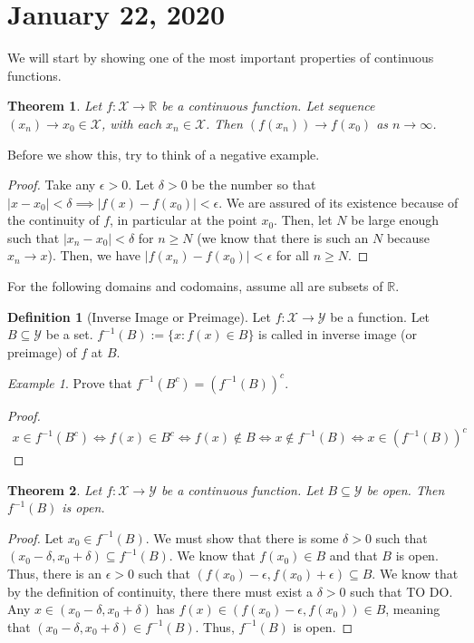 \documentclass[11pt]{article}
\newcommand{\R}{\ensuremath{\mathbb R}}
\newcommand{\X}{\ensuremath{\mathcal X}}
\newcommand{\Y}{\ensuremath{\mathcal Y}}
\newcommand{\e}{\epsilon}
\newcommand{\sse}{\subseteq}
\theoremstyle{plain}
\newtheorem{thm}{Theorem}[section]
\theoremstyle{definition}
\newtheorem{defi}{Definition}[section]
\theoremstyle{remark}
\newtheorem{exm}{Example}[section]
\begin{document}
\section{January 22, 2020}

We will start by showing one of the most important properties of continuous functions.
\begin{thm}
    Let $f: \X \rightarrow \R$ be a continuous function. Let sequence $(x_n) \rightarrow x_0 \in \X$, with each $x_n \in \X$. Then $(f(x_n)) \rightarrow f(x_0)$ as $n \rightarrow \infty$.
\end{thm}
Before we show this, try to think of a negative example.
\begin{proof}
    Take any $\e > 0$. Let $\delta > 0$ be the number so that $|x - x_0| < \delta \implies |f(x) - f(x_0)| < \e$. We are assured of its existence because of the continuity of $f$, in particular at the point $x_0$. Then, let $N$ be large enough such that $|x_n - x_0| < \delta$ for $n \geq N$ (we know that there is such an $N$ because $x_n \rightarrow x$). Then, we have $|f(x_n) - f(x_0)| < \e$ for all $n \geq N$.
\end{proof}

For the following domains and codomains, assume all are subsets of $\R$.
\begin{defi}[Inverse Image or Preimage]
    Let $f: \X \rightarrow \Y$ be a function. Let $B \sse \Y$ be a set. $f^{-1}(B) := \{x: f(x) \in B\}$ is called in inverse image (or preimage) of $f$ at $B$.
\end{defi}
\begin{exm}
    Prove that $f^{-1}(B^c) = (f^{-1}(B))^c$.
\end{exm}
\begin{proof}
    \begin{align*}
        x \in  f^{-1}(B^c) \iff f(x) \in B^c \iff f(x) \notin B \iff x \notin f^{-1}(B) \iff x \in (f^{-1}(B))^c
    \end{align*}
\end{proof}

\begin{thm}
    Let $f: \X \rightarrow \Y$ be a continuous function. Let $B \sse \Y$ be open. Then $f^{-1}(B)$ is open.
\end{thm}
\begin{proof}
    Let $x_0 \in f^{-1}(B)$. We must show that there is some $\delta > 0$ such that $(x_0 - \delta, x_0 + \delta) \sse f^{-1}(B)$. We know that $f(x_0) \in B$ and that $B$ is open. Thus, there is an $\e > 0$ such that $(f(x_0) - \e, f(x_0) + \e) \sse B$. We know that by the definition of continuity, there there must exist a $\delta > 0$ such that TO DO. Any $x \in (x_0 - \delta, x_0 + \delta)$ has $f(x) \in (f(x_0) - \e, f(x_0)) \in B$, meaning that $(x_0 - \delta, x_0 + \delta) \in f^{-1}(B)$. Thus, $f^{-1}(B)$ is open.
\end{proof}
\end{document}

